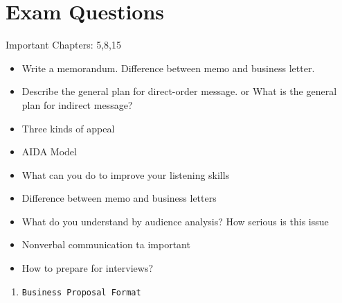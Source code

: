 \documentclass[11pt]{article}
\begin{document}
\section{Exam Questions}
\label{sec:org4aabeb0}
Important Chapters: 5,8,15
\begin{itemize}
\item Write a memorandum. Difference between memo and business letter.
\item Describe the general plan for direct-order message. or What is the general plan for indirect message?
\item Three kinds of appeal
\item AIDA Model
\item What can you do to improve your listening skills
\item Difference between memo and business letters
\item What do you understand by audience analysis? How serious is this issue
\item Nonverbal communication ta important
\item How to prepare for interviews?
\end{itemize}



\begin{enumerate}
\item \texttt{Business Proposal Format}
\end{enumerate}
\end{document}
